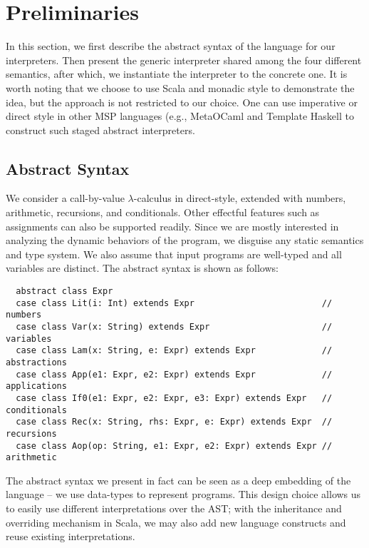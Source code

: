 \newcommand{\TLang}{$L_\lambda$}

\section{Preliminaries} \label{prelim}

In this section, we first describe the abstract syntax of the language for our interpreters. 
Then present the generic interpreter shared among the four different
semantics, after which, we instantiate the interpreter to the concrete one.
It is worth noting that we choose to use Scala and monadic style to
demonstrate the idea, but the approach is not restricted to our
choice. One can use imperative or direct style in other MSP languages
(e.g., MetaOCaml \cite{DBLP:conf/gpce/CalcagnoTHL03, DBLP:conf/flops/Kiselyov14}
and Template Haskell \cite{Sheard:2002:TMH:636517.636528} to construct
such staged abstract interpreters.

\subsection{Abstract Syntax} \label{bg_lang}

We consider a call-by-value $\lambda$-calculus in direct-style, extended
with numbers, arithmetic, recursions, and conditionals. Other effectful features
such as assignments can also be supported readily.
Since we are mostly interested in analyzing the dynamic behaviors of the
program, we disguise any static semantics and type system. We also assume that
input programs are well-typed and all variables are distinct. The abstract
syntax is shown as follows:

\begin{lstlisting}
  abstract class Expr
  case class Lit(i: Int) extends Expr                         // numbers
  case class Var(x: String) extends Expr                      // variables
  case class Lam(x: String, e: Expr) extends Expr             // abstractions
  case class App(e1: Expr, e2: Expr) extends Expr             // applications
  case class If0(e1: Expr, e2: Expr, e3: Expr) extends Expr   // conditionals
  case class Rec(x: String, rhs: Expr, e: Expr) extends Expr  // recursions
  case class Aop(op: String, e1: Expr, e2: Expr) extends Expr // arithmetic
\end{lstlisting}

The abstract syntax we present in fact can be seen as a deep embedding of the
language -- we use data-types to represent programs. This design choice allows us
to easily use different interpretations over the AST; with the inheritance and
overriding mechanism in Scala, we may also add new language constructs and reuse
existing interpretations.

